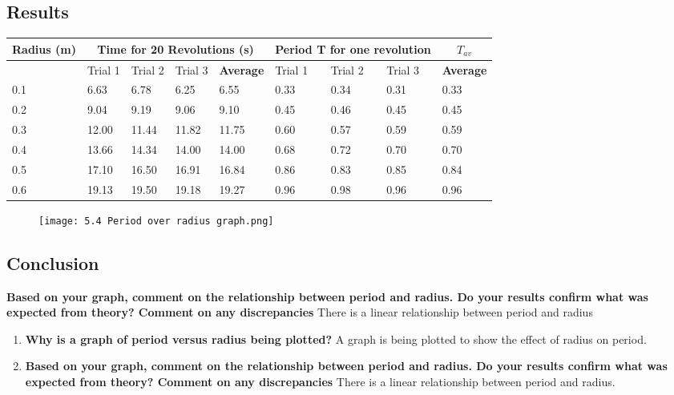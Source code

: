 	\subsection{Results}
		\begin{table}[htbp]
			\centering
			  \begin{tabular}{l|lll|l|lll|l}
			  \multicolumn{1}{c}{Radius (m)} & \multicolumn{4}{c}{Time for 20 Revolutions (s)} & \multicolumn{3}{c}{Period T for one revolution} & \multicolumn{1}{c}{$T_{av}$} \\[5pt] \hline
					& Trial 1 & Trial 2 & Trial 3 & \textbf{Average} & Trial 1 & Trial 2 & Trial 3 & \textbf{Average} \\
			  0.1   & 6.63  & 6.78  & 6.25  & 6.55  & 0.33  & 0.34  & 0.31  & 0.33 \\
			  0.2   & 9.04  & 9.19  & 9.06  & 9.10  & 0.45  & 0.46  & 0.45  & 0.45 \\
			  0.3   & 12.00 & 11.44 & 11.82 & 11.75 & 0.60  & 0.57  & 0.59  & 0.59 \\
			  0.4   & 13.66 & 14.34 & 14.00 & 14.00 & 0.68  & 0.72  & 0.70  & 0.70 \\
			  0.5   & 17.10 & 16.50 & 16.91 & 16.84 & 0.86  & 0.83  & 0.85  & 0.84 \\
			  0.6   & 19.13 & 19.50 & 19.18 & 19.27 & 0.96  & 0.98  & 0.96  & 0.96 \\
			\end{tabular}
		\end{table}
		
		\begin{figure}[H]
			\centering
			\texttt{[image: 5.4 Period over radius graph.png]}
		\end{figure}

	\subsection{Conclusion}
		\textbf{Based on your graph, comment on the relationship between period and radius. Do your results confirm what was expected from theory? Comment on any discrepancies}
		There is a linear relationship between period and radius
	\begin{enumerate} 
		\item \textbf{Why is a graph of period versus radius being plotted?}
			\subitem A graph is being plotted to show the effect of radius on period.
		\item \textbf{Based on your graph, comment on the relationship between period and radius. Do your results confirm what was expected from theory? Comment on any discrepancies}
			\subitem There is a linear relationship between period and radius.
	\end{enumerate}

